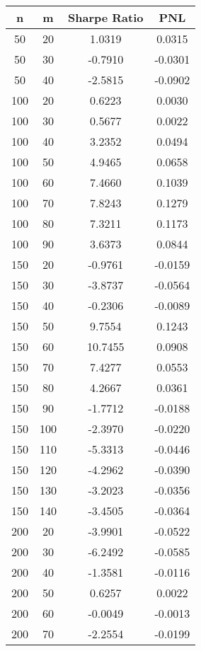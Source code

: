 \documentclass[11pt]{article}
\begin{document}
\begin{center}
\begin{longtable}{cccc}
  \hline
n & m & Sharpe Ratio & PNL \\  
  \hline
   50 &    20 & 1.0319 & 0.0315 \\ 
     50 &    30 & -0.7910 & -0.0301 \\ 
     50 &    40 & -2.5815 & -0.0902 \\ 
    100 &    20 & 0.6223 & 0.0030 \\ 
    100 &    30 & 0.5677 & 0.0022 \\ 
    100 &    40 & 3.2352 & 0.0494 \\ 
    100 &    50 & 4.9465 & 0.0658 \\ 
    100 &    60 & 7.4660 & 0.1039 \\ 
    100 &    70 & 7.8243 & 0.1279 \\ 
    100 &    80 & 7.3211 & 0.1173 \\ 
    100 &    90 & 3.6373 & 0.0844 \\ 
    150 &    20 & -0.9761 & -0.0159 \\ 
    150 &    30 & -3.8737 & -0.0564 \\ 
    150 &    40 & -0.2306 & -0.0089 \\ 
    150 &    50 & 9.7554 & 0.1243 \\ 
    150 &    60 & 10.7455 & 0.0908 \\ 
    150 &    70 & 7.4277 & 0.0553 \\ 
    150 &    80 & 4.2667 & 0.0361 \\ 
    150 &    90 & -1.7712 & -0.0188 \\ 
    150 &   100 & -2.3970 & -0.0220 \\ 
    150 &   110 & -5.3313 & -0.0446 \\ 
    150 &   120 & -4.2962 & -0.0390 \\ 
    150 &   130 & -3.2023 & -0.0356 \\ 
    150 &   140 & -3.4505 & -0.0364 \\ 
    200 &    20 & -3.9901 & -0.0522 \\ 
    200 &    30 & -6.2492 & -0.0585 \\ 
    200 &    40 & -1.3581 & -0.0116 \\ 
    200 &    50 & 0.6257 & 0.0022 \\ 
    200 &    60 & -0.0049 & -0.0013 \\ 
    200 &    70 & -2.2554 & -0.0199 \\ 

\end{longtable}
\end{center}
\end{document}
